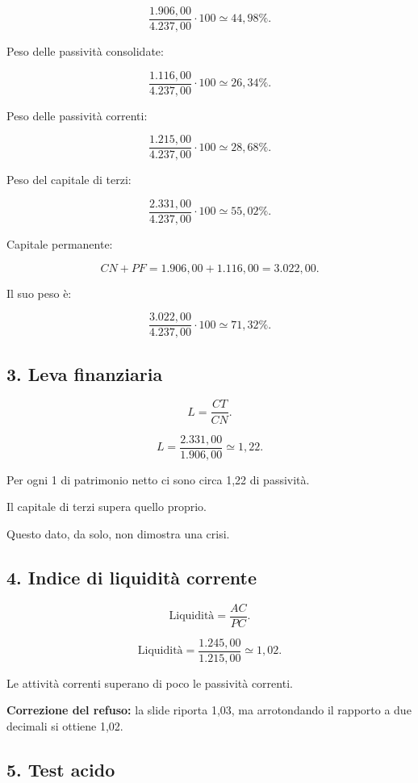 \[
\frac{1.906{,}00}{4.237{,}00}\cdot100
\simeq
\boxed{44{,}98\%}.
\]

\noindent Peso delle passività consolidate:

\[
\frac{1.116{,}00}{4.237{,}00}\cdot100
\simeq
\boxed{26{,}34\%}.
\]

\noindent Peso delle passività correnti:

\[
\frac{1.215{,}00}{4.237{,}00}\cdot100
\simeq
\boxed{28{,}68\%}.
\]

\noindent Peso del capitale di terzi:

\[
\frac{2.331{,}00}{4.237{,}00}\cdot100
\simeq
\boxed{55{,}02\%}.
\]

\noindent Capitale permanente:

\[
CN+PF=
1.906{,}00+1.116{,}00
=
3.022{,}00.
\]

\noindent Il suo peso è:

\[
\frac{3.022{,}00}{4.237{,}00}\cdot100
\simeq
\boxed{71{,}32\%}.
\]


\subsection*{3. Leva finanziaria}

\[
L=\frac{CT}{CN}.
\]

\[
L=
\frac{2.331{,}00}{1.906{,}00}
\simeq
\boxed{1{,}22}.
\]

\noindent Per ogni 1 di patrimonio netto
ci sono circa 1,22 di passività.

\noindent Il capitale di terzi
supera quello proprio.

\noindent Questo dato,
da solo,
non dimostra una crisi.


\subsection*{4. Indice di liquidità corrente}

\[
\text{Liquidità}=\frac{AC}{PC}.
\]

\[
\text{Liquidità}
=
\frac{1.245{,}00}{1.215{,}00}
\simeq
\boxed{1{,}02}.
\]

\noindent Le attività correnti
superano di poco
le passività correnti.

\noindent \textbf{Correzione del refuso:}
la slide riporta 1,03,
ma arrotondando il rapporto
a due decimali si ottiene 1,02.


\subsection*{5. Test acido}

